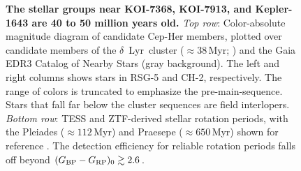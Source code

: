 \documentclass[12pt,twocolumn]{aastex63}
\newcommand{\bpmrpo}{(G_{\rm BP}-G_{\rm RP})_0}
\begin{document}
\begin{figure}[tp]
\begin{center}
		\vspace{-0.6cm}
	\end{center}
	\vspace{-0.7cm}
	\caption{
		{\bf The stellar groups near KOI-7368, KOI-7913, and Kepler-1643
    are 40 to 50 million years old.} 
    {\it Top row}: 
    Color-absolute magnitude diagram of candidate Cep-Her members, plotted
    over candidate members of the $\delta$~Lyr~cluster
    ($\approx38$\,Myr; \citealt{bouma_kep1627_2022}) and the Gaia
    EDR3 Catalog of Nearby Stars (gray background).  The left and
    right columns shows stars in RSG-5 and CH-2, respectively.  The
    range of colors is truncated to emphasize the pre-main-sequence.
    Stars that fall far below the cluster sequences are field
    interlopers.
    {\it Bottom row}:
    TESS and ZTF-derived stellar rotation periods, with the Pleiades
    ($\approx 112$\,Myr) and Praesepe ($\approx 650$\,Myr) shown for reference
    \citep{rebull_rotation_2016a,douglas_poking_2017}.
    The detection efficiency for reliable rotation periods falls off
    beyond $\bpmrpo \gtrsim 2.6$.
	\label{fig:age}
	}
\end{figure}
\end{document}
